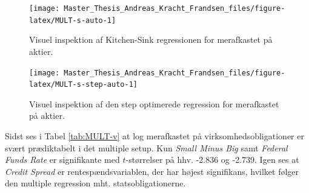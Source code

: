 \documentclass[
  a4paper,
  oneside]{memoir}
\begin{document}
\begin{table}[H]
\begin{threeparttable}
\begin{tablenotes}
\end{tablenotes}
\end{threeparttable}
\end{table}

\begin{figure}[H]

{\centering \texttt{[image: Master\_Thesis\_Andreas\_Kracht\_Frandsen\_files/figure-latex/MULT-s-auto-1]} 

}

\caption{Visuel inspektion af Kitchen-Sink regressionen for merafkastet på aktier.}\label{fig:MULT-s-auto}
\end{figure}

\begin{figure}[H]

{\centering \texttt{[image: Master\_Thesis\_Andreas\_Kracht\_Frandsen\_files/figure-latex/MULT-s-step-auto-1]} 

}

\caption{Visuel inspektion af den step optimerede regression for merafkastet på aktier.}\label{fig:MULT-s-step-auto}
\end{figure}

Sidst ses i Tabel \ref{tab:MULT-v} at log merafkastet på virksomhedsobligationer er svært prædiktabelt i det multiple setup. Kun \emph{Small Minus Big} samt \emph{Federal Funds Rate} er signifikante med \(t\)-størrelser på hhv. -2.836 og -2.739. Igen ses at \emph{Credit Spread} er rentespændsvariablen, der har højest signifikans, hvilket følger den multiple regression mht. statsobligationerne.
\end{document}
